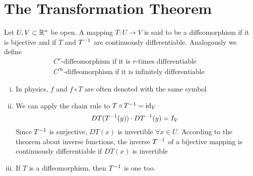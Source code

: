 \documentclass[../../script.tex]{subfiles}
\begin{document}
\section{The Transformation Theorem}

\begin{defi}
    Let $U, V \subset \mathbb{R}^n$ be open. A mapping $T: U \rightarrow V$ is said to be a diffeomorphism if it is bijective and if 
    $T$ and ${T}^{-1}$ are continuously differentiable. Analogously we define 
    \begin{gather*}
        C^r \text{-diffeomorphism if it is } r \text{-times differentiable} \\
        C^{\infty} \text{-diffeomorphism if it is infinitely differentiable}
    \end{gather*}
\end{defi}

\begin{rem}
    \begin{enumerate}[(i)]
        \item In physics, $f$ and $f \circ T$ are often denoted with the same symbol
        \item We can apply the chain rule to $T \circ {T}^{-1} = \text{id}_V$
        \[
            DT({T}^{-1}(y)) \cdot D{T}^{-1}(y) = I_V
        \]
        Since ${T}^{-1}$ is surjective, $DT(x)$ is invertible $\forall x \in U$. According to the theorem about inverse functions, 
        the inverse ${T}^{-1}$ of a bijective mapping is continuously differentiable if $DT(x)$ is invertible 
        \item If $T$ is a diffeomorphism, then ${T}^{-1}$ is one too.
    \end{enumerate}
\end{rem}
\end{document}
